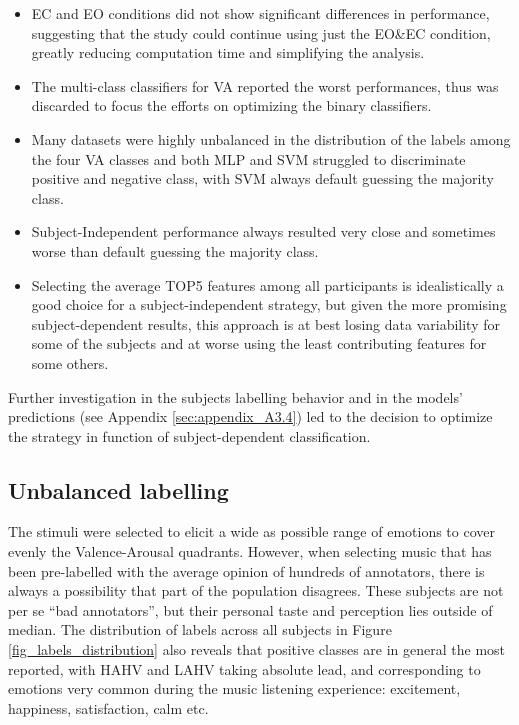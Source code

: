 \begin{itemize}
\item 	\ac{EC} and \ac{EO} conditions did not show significant differences in performance, suggesting that the study could continue using just the EO\&EC condition, greatly reducing computation time and simplifying the analysis.
\item 	The multi-class classifiers for \ac{VA} reported the worst performances, thus was discarded to focus the efforts on optimizing the binary classifiers.
\item 	Many datasets were highly unbalanced in the distribution of the labels among the four \ac{VA} classes and both \ac{MLP} and \ac{SVM} struggled to discriminate positive and negative class, with \ac{SVM} always default guessing the majority class.
\item 	Subject-Independent performance always resulted very close and sometimes worse than default guessing the majority class.
\item 	Selecting the average TOP5 features among all participants is idealistically a good choice for a subject-independent strategy, but given the more promising subject-dependent results, this approach is at best losing data variability for some of the subjects and at worse using the least contributing features for some others.
\end{itemize}

Further investigation in the subjects labelling behavior and in the models’ predictions (see Appendix \ref{sec:appendix_A3.4}) led to the decision to optimize the strategy in function of subject-dependent classification.

\subsection{Unbalanced labelling}
\label{sec:unbalanced_labelling}
The stimuli were selected to elicit a wide as possible range of emotions to cover evenly the Valence-Arousal quadrants. However, when selecting music that has been pre-labelled with the average opinion of hundreds of annotators, there is always a possibility that part of the population disagrees. These subjects are not per se “bad annotators”, but their personal taste and perception lies outside of median. The distribution of labels across all subjects in Figure \ref{fig_labels_distribution} also reveals that positive classes are in general the most reported, with HAHV and LAHV taking absolute lead, and corresponding to emotions very common during the music listening experience: excitement, happiness, satisfaction, calm etc.

